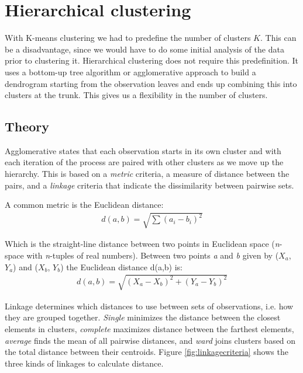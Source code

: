 \section{Hierarchical clustering}

With K-means clustering we had to predefine the number of clusters $K$. This can be a disadvantage, since we would have to do some initial analysis of the data prior to clustering it. Hierarchical clustering does not require this predefinition. It uses a bottom-up tree algorithm or agglomerative approach to build a dendrogram starting from the observation leaves and ends up combining this into clusters at the trunk. This gives us a flexibility in the number of clusters.

\subsection{Theory}

Agglomerative states that each observation starts in its own cluster and with each iteration of the process are paired with other clusters as we move up the hierarchy.  This is based on a \textit{metric} criteria, a measure of distance between the pairs, and a \textit{linkage} criteria that indicate the dissimilarity between pairwise sets.

A common metric is the Euclidean distance:
\begin{align}
	d(a,b) = \sqrt{\sum (a_{i} - b_{i})^{2}}  %
\end{align}

Which is the straight-line distance between two points in Euclidean space (\textit{n}-space with \textit{n}-tuples of real numbers). Between two points \textit{a} and \textit{b} given by ($X_a$, $Y_a$) and ($X_b$, $Y_b$) the Euclidean distance d(a,b) is:
\begin{align}
	d(a,b) = \sqrt{(X_a - X_b)^2 + (Y_a - Y_b)^2}
\end{align}

Linkage determines which distances to use between sets of observations, i.e. how they are grouped together. \textit{Single} minimizes the distance between the closest elements in clusters, \textit{complete} maximizes distance between the farthest elements, \textit{average} finds the mean of all pairwise distances, and \textit{ward} joins clusters based on the total distance between their centroids. Figure \ref{fig:linkagecriteria} shows the three kinds of linkages to calculate distance.

